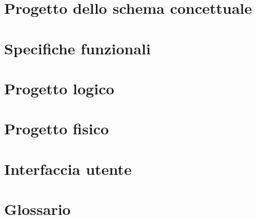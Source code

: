 \documentclass[a4paper,12pt]{report}
\begin{document}
\chapter{Progetto dello schema concettuale}

\chapter{Specifiche funzionali}

\chapter{Progetto logico}

\chapter{Progetto fisico}

\chapter{Interfaccia utente}

\chapter{Glossario}
\end{document}
